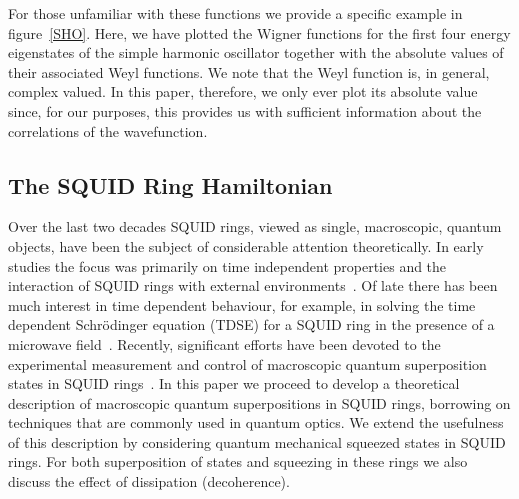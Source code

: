 \documentclass[12pt,a4paper,superscriptaddress,showpacs,floatfix,pra]{revtex4-2}
\begin{document}
For  those  unfamiliar with  these  functions  we  provide a  specific
example  in  figure~\ref{SHO}.  Here,   we  have  plotted  the  Wigner
functions for the first four energy eigenstates of the simple harmonic
oscillator together with the  absolute values of their associated Weyl
functions.  We note  that the  Weyl function  is, in  general, complex
valued. In this paper, therefore, we only ever plot its absolute value
since, for our purposes,  this provides us with sufficient information
about the correlations of the wavefunction.

\subsection{The SQUID Ring Hamiltonian}

Over the last two decades  SQUID rings, viewed as single, macroscopic,
quantum  objects,  have been  the  subject  of considerable  attention
theoretically.  In  early studies  the  focus  was  primarily on  time
independent  properties  and  the  interaction  of  SQUID  rings  with
external  environments~\cite{Spi1992,SrivastavaW87,LeggettCDFGZ87}. Of
late there  has been  much interest in  time dependent  behaviour, for
example, in solving the time dependent Schr\"{o}dinger equation (TDSE)
for    a   SQUID    ring   in    the   presence    of    a   microwave
field~\cite{ClarkDREPPWWS98,DigginsWCPPRS97-b}.  Recently, significant
efforts have been devoted  to the experimental measurement and control
of    macroscopic    quantum    superposition    states    in    SQUID
rings~\cite{FriedmanPCTL00}.  In this  paper we  proceed to  develop a
theoretical description of macroscopic quantum superpositions in SQUID
rings,  borrowing on  techniques  that are  commonly  used in  quantum
optics. We  extend the usefulness  of this description  by considering
quantum  mechanical   squeezed  states   in  SQUID  rings.   For  both
superposition of states  and squeezing in these rings  we also discuss
the effect of dissipation (decoherence).
\end{document}
